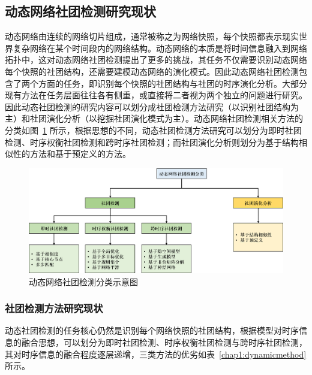 
\subsection{动态网络社团检测研究现状}

动态网络由连续的网络切片组成，通常被称之为网络快照，每个快照都表示现实世界复杂网络在某个时间段内的网络结构。动态网络的本质是将时间信息融入到网络拓扑中，这对动态网络社团检测提出了更多的挑战，其任务不仅需要识别动态网络每个快照的社团结构，还需要建模动态网络的演化模式。因此动态网络社团检测包含了两个方面的任务，即识别每个快照的社团结构与社团的时序演化分析\cite{rossetti2018community}。大部分现有方法在任务层面往往各有侧重，或直接将二者视为两个独立的问题进行研究。因此动态社团检测的研究内容可以划分成社团检测方法研究（以识别社团结构为主）和社团演化分析（以挖掘社团演化模式为主）\cite{rossetti2018community}。动态网络社团检测相关方法的分类如图~\ref{chap1:fig:dcdclasses} 所示，根据思想的不同，动态社团检测方法研究可以划分为即时社团检测、时序权衡社团检测和跨时序社团检测；而社团演化分析则划分为基于结构相似性的方法和基于预定义的方法。
\begin{figure}
    \centering
    \includegraphics[width=.8\linewidth]{figures/chap01/classification of dcd.png}
    \caption{动态网络社团检测分类示意图}
    \label{chap1:fig:dcdclasses}
\end{figure}

\subsubsection{社团检测方法研究现状}

动态社团检测的任务核心仍然是识别每个网络快照的社团结构，根据模型对时序信息的融合思想，可以划分为即时社团检测、时序权衡社团检测与跨时序社团检测，其对时序信息的融合程度逐层递增，三类方法的优劣如表~\ref{chap1:dynamicmethod}所示。

